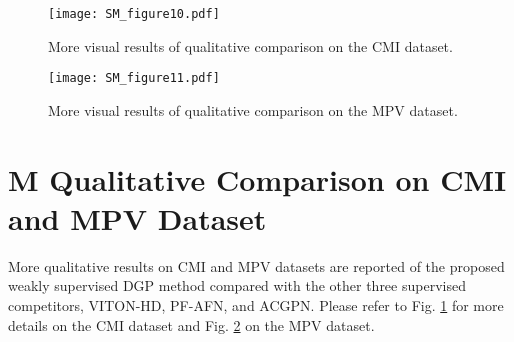 \documentclass[10pt,twocolumn,letterpaper]{article}
\begin{document}
\clearpage

\begin{figure}[h]
  \centering
  \texttt{[image: SM\_figure10.pdf]}
  \caption{More visual results of qualitative comparison on the CMI dataset.}\label{fig: SM_compare_CMI}
\end{figure}


\begin{figure}[h]
  \centering
  \texttt{[image: SM\_figure11.pdf]}
  \caption{More visual results of qualitative comparison on the MPV dataset.}\label{fig: SM_compare_MPV}
\end{figure}

\clearpage



\section*{M Qualitative Comparison on CMI and MPV Dataset}
More qualitative results on CMI and MPV datasets are reported of the proposed weakly supervised DGP method compared with the other three supervised competitors, VITON-HD, PF-AFN, and ACGPN. Please refer to Fig. \ref{fig: SM_compare_CMI} for more details on the CMI dataset and Fig. \ref{fig: SM_compare_MPV} on the MPV dataset.


\clearpage
\twocolumn
\end{document}
